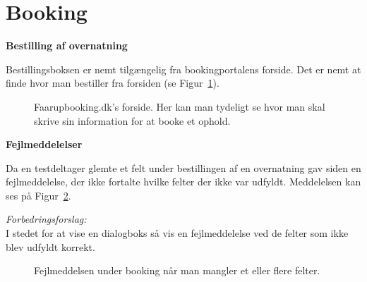 \documentclass[10pt,a4paper]{article}      %
\newenvironment{forslag}{\emph{Forbedringsforslag:}\\[0.5mm]}{}
\newcommand\pic[1]{\texttt{[image: Pics/\#1]}}
\renewcommand\good{\pic{good}}
\renewcommand\smallproblem{\pic{smallproblem}}
\begin{document}
\section{Booking}
\begin{kommentarer}
\item[\good] \textbf{Bestilling af overnatning}

Bestillingsboksen er nemt tilgængelig fra bookingportalens forside. Det er nemt
at finde hvor man bestiller fra forsiden (se Figur~\ref{fig:forsidebooking}). 


\begin{figure}[htbp]
    \centering
    \caption{Faarupbooking.dk's forside. Her kan man tydeligt se hvor man skal
    skrive sin information for at booke et ophold.}
    \label{fig:forsidebooking}
\end{figure}

\item[\smallproblem] \textbf{Fejlmeddelelser}

Da en testdeltager glemte et felt under bestillingen af en overnatning gav siden
en fejlmeddelelse, der ikke fortalte hvilke felter der ikke var udfyldt.
Meddelelsen kan ses på Figur~\ref{fig:fejlmeddelelsebooking}.

\begin{forslag}
I stedet for at vise en dialogboks så vis en fejlmeddelelse ved de felter som ikke blev
udfyldt korrekt.
\end{forslag}

\begin{figure}[htbp]
    \centering
    \caption{Fejlmeddelsen under booking når man mangler et eller flere felter.}
    \label{fig:fejlmeddelelsebooking}
\end{figure}


\end{kommentarer}
\end{document}
